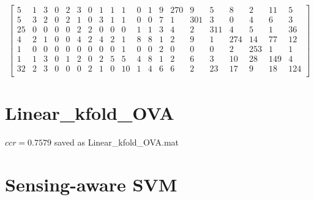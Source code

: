 \documentclass[a4paper, 11pt]{article}
\begin{document}
\[\begin{bmatrix}
     5  &   1  &   3  &   0   &  2  &   3 &    0  &   1  &   1  &   1  &   0 &    1  &   9  & 270  &   9  &   5  &   8  &   2  &  11  &   5 \\
     5  &   3  &   2  &   0   &  2  &   1 &    0  &   3  &   1  &   1  &   0 &    0  &   7  &   1  & 301  &   3  &   0  &   4  &   6  &   3 \\
    25  &   0  &   0  &   0   &  0  &   2 &    2  &   0  &   0  &   0  &   1 &    1  &   3  &   4  &   2  & 311  &   4  &   5  &   1  &  36 \\
     4  &   2  &   1  &   0   &  0  &   4 &    2  &   4  &   2  &   1  &   8 &    8  &   1  &   2  &   9  &   1  & 274  &  14  &  77  &  12 \\
     1  &   0  &   0  &   0   &  0  &   0 &    0  &   0  &   0  &   1  &   0 &    0  &   2  &   0  &   0  &   0  &   2  & 253  &   1  &   1 \\
     1  &   1  &   3  &   0   &  1  &   2 &    0  &   2  &   5  &   5  &   4 &    8  &   1  &   2  &   6  &   3  &  10  &  28  & 149  &   4 \\
    32  &   2  &   3  &   0   &  0  &   0 &    2  &   1  &   0  &  10  &   1 &    4  &   6  &   6  &   2  &  23  &  17  &   9  &  18  & 124 \\
\end{bmatrix}\]
\section{Linear_kfold_OVA}
$ccr=0.7579$
saved as Linear_kfold_OVA.mat
\section{Sensing-aware SVM}
\end{document}
